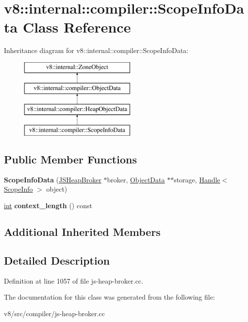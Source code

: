 \hypertarget{classv8_1_1internal_1_1compiler_1_1ScopeInfoData}{}\section{v8\+:\+:internal\+:\+:compiler\+:\+:Scope\+Info\+Data Class Reference}
\label{classv8_1_1internal_1_1compiler_1_1ScopeInfoData}
Inheritance diagram for v8\+:\+:internal\+:\+:compiler\+:\+:Scope\+Info\+Data\+:\begin{figure}[H]
\begin{center}
\leavevmode
\includegraphics[height=4.000000cm]{classv8_1_1internal_1_1compiler_1_1ScopeInfoData}
\end{center}
\end{figure}
\subsection*{Public Member Functions}
\begin{DoxyCompactItemize}
\item 
\mbox{\label{classv8_1_1internal_1_1compiler_1_1ScopeInfoData_a6523ffb07b90c3737757257931b6a675}} 
{\bfseries Scope\+Info\+Data} (\mbox{\hyperlink{classv8_1_1internal_1_1compiler_1_1JSHeapBroker}{J\+S\+Heap\+Broker}} $\ast$broker, \mbox{\hyperlink{classv8_1_1internal_1_1compiler_1_1ObjectData}{Object\+Data}} $\ast$$\ast$storage, \mbox{\hyperlink{classv8_1_1internal_1_1Handle}{Handle}}$<$ \mbox{\hyperlink{classv8_1_1internal_1_1ScopeInfo}{Scope\+Info}} $>$ object)
\item 
\mbox{\label{classv8_1_1internal_1_1compiler_1_1ScopeInfoData_a82fc3b58f4ec376109c1aab7baba4559}} 
\mbox{\hyperlink{classint}{int}} {\bfseries context\+\_\+length} () const
\end{DoxyCompactItemize}
\subsection*{Additional Inherited Members}


\subsection{Detailed Description}


Definition at line 1057 of file js-\/heap-\/broker.\+cc.



The documentation for this class was generated from the following file\+:\begin{DoxyCompactItemize}
\item 
v8/src/compiler/js-\/heap-\/broker.\+cc\end{DoxyCompactItemize}
